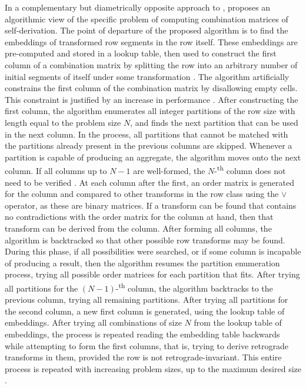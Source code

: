 In a complementary but diametrically opposite approach to \cite{Starr1984}, \cite{Kowalski1987b} proposes an algorithmic view of the specific problem of computing combination matrices of self-derivation. The point of departure of the proposed algorithm is to find the embeddings of transformed row segments in the row itself. These embeddings are pre-computed and stored in a lookup table, then used to construct the first column of a combination matrix by splitting the row into an arbitrary number of initial segments of itself under some transformation \cite[29]{Kowalski1987b}. The algorithm artificially constrains the first column of the combination matrix by disallowing empty cells. This constraint is justified by an increase in performance \cite[30]{Kowalski1987b}. After constructing the first column, the algorithm enumerates all integer partitions of the row size with length equal to the problem size $N$, and finds the next partition that can be used in the next column. In the process, all partitions that cannot be matched with the partitions already present in the previous columns are skipped. Whenever a partition is capable of producing an aggregate, the algorithm moves onto the next column. If all columns up to $N - 1$ are well-formed, the $N$-\textsuperscript{th} column does not need to be verified \cite[31]{Kowalski1987b}. At each column after the first, an order matrix is generated for the column and compared to other transforms in the row class using the $\lor$ operator, as these are binary matrices. If a transform can be found that contains no contradictions with the order matrix for the column at hand, then that transform can be derived from the column. After forming all columns, the algorithm is backtracked so that other possible row transforms may be found. During this phase, if all possibilities were searched, or if some column is incapable of producing a result, then the algorithm resumes the partition enumeration process, trying all possible order matrices for each partition that fits. After trying all partitions for the $(N - 1)$-\textsuperscript{th} column, the algorithm backtracks to the previous column, trying all remaining partitions. After trying all partitions for the second column, a new first column is generated, using the lookup table of embeddings. After trying all combinations of size $N$ from the lookup table of embeddings, the process is repeated reading the embedding table backwards while attempting to form the first columns, that is, trying to derive retrograde transforms in them, provided the row is not retrograde-invariant. This entire process is repeated with increasing problem sizes, up to the maximum desired size \cite[32]{Kowalski1987b}.

